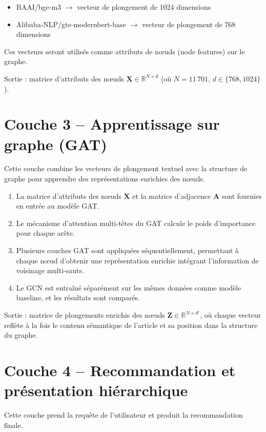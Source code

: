 \begin{itemize}
    \item BAAI/bge-m3 $\rightarrow$ vecteur de plongement de 1024 dimensions
    \item Alibaba-NLP/gte-modernbert-base $\rightarrow$ vecteur de plongement de 768 dimensions
\end{itemize}

Ces vecteurs seront utilisés comme attributs de n\oe uds (node features) sur le graphe.

Sortie : matrice d'attributs des n\oe uds $\mathbf{X} \in \mathbb{R}^{N \times d}$ (où $N = 11\,701$, $d \in \{768, 1024\}$).

\section{Couche 3 -- Apprentissage sur graphe (GAT)}

Cette couche combine les vecteurs de plongement textuel avec la structure de graphe pour apprendre des représentations enrichies des n\oe uds.

\begin{enumerate}
    \item La matrice d'attributs des n\oe uds $\mathbf{X}$ et la matrice d'adjacence $\mathbf{A}$ sont fournies en entrée au modèle GAT.
    \item Le mécanisme d'attention multi-têtes du GAT calcule le poids d'importance pour chaque arête.
    \item Plusieurs couches GAT sont appliquées séquentiellement, permettant à chaque n\oe ud d'obtenir une représentation enrichie intégrant l'information de voisinage multi-sauts.
    \item Le GCN est entraîné séparément sur les mêmes données comme modèle baseline, et les résultats sont comparés.
\end{enumerate}

Sortie : matrice de plongements enrichis des n\oe uds $\mathbf{Z} \in \mathbb{R}^{N \times d'}$, où chaque vecteur reflète à la fois le contenu sémantique de l'article et sa position dans la structure du graphe.

\section{Couche 4 -- Recommandation et présentation hiérarchique}

Cette couche prend la requête de l'utilisateur et produit la recommandation finale.

